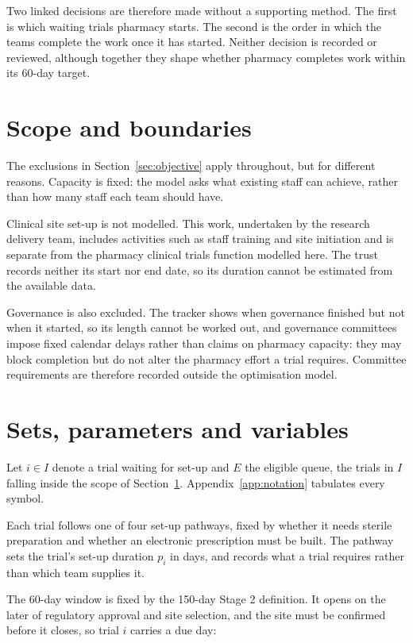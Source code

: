 Two linked decisions are therefore made without a supporting method. The first is which waiting trials pharmacy starts. The second is the order in which the teams complete the work once it has started. Neither decision is recorded or reviewed, although together they shape whether pharmacy completes work within its 60-day target.

\section{Scope and boundaries}
\label{sec:scope}

The exclusions in Section~\ref{sec:objective} apply throughout, but for different reasons. Capacity is fixed: the model asks what existing staff can achieve, rather than how many staff each team should have.

Clinical site set-up is not modelled. This work, undertaken by the research delivery team, includes activities such as staff training and site initiation and is separate from the pharmacy clinical trials function modelled here. The trust records neither its start nor end date, so its duration cannot be estimated from the available data.

Governance is also excluded. The tracker shows when governance finished but not when it started, so its length cannot be worked out, and governance committees impose fixed calendar delays rather than claims on pharmacy capacity: they may block completion but do not alter the pharmacy effort a trial requires. Committee requirements are therefore recorded outside the optimisation model.

\section{Sets, parameters and variables}
\label{sec:sets}

Let $i \in I$ denote a trial waiting for set-up and $E$ the eligible queue, the trials in $I$ falling inside the scope of Section~\ref{sec:scope}. Appendix~\ref{app:notation} tabulates every symbol.

Each trial follows one of four set-up pathways, fixed by whether it needs sterile preparation and whether an electronic prescription must be built. The pathway sets the trial's set-up duration $p_i$ in days, and records what a trial requires rather than which team supplies it.

The 60-day window is fixed by the 150-day Stage 2 definition. It opens on the later of regulatory approval and site selection, and the site must be confirmed before it closes, so trial $i$ carries a due day:

